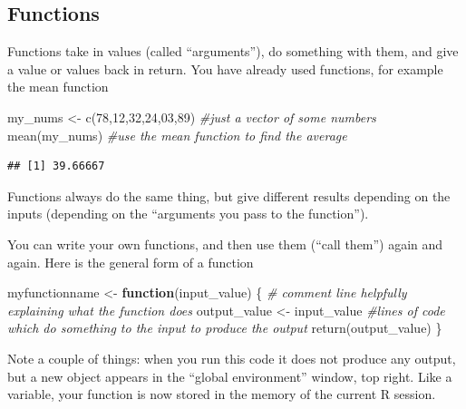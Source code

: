 \documentclass[
  12pt,
  a5paper,
]{book}
\newenvironment{Shaded}{\begin{snugshade}}{\end{snugshade}}
\newcommand{\CommentTok}[1]{\textcolor[rgb]{0.56,0.35,0.01}{\textit{#1}}}
\newcommand{\ControlFlowTok}[1]{\textcolor[rgb]{0.13,0.29,0.53}{\textbf{#1}}}
\newcommand{\DecValTok}[1]{\textcolor[rgb]{0.00,0.00,0.81}{#1}}
\newcommand{\FunctionTok}[1]{\textcolor[rgb]{0.00,0.00,0.00}{#1}}
\newcommand{\NormalTok}[1]{#1}
\newcommand{\OtherTok}[1]{\textcolor[rgb]{0.56,0.35,0.01}{#1}}
\begin{document}
\hypertarget{functions}{%
\subsection{Functions}\label{functions}}

Functions take in values (called ``arguments''), do something with them, and give a value or values back in return. You have already used functions, for example the mean function

\begin{Shaded}
\begin{Highlighting}[]
\NormalTok{my\_nums }\OtherTok{\textless{}{-}} \FunctionTok{c}\NormalTok{(}\DecValTok{78}\NormalTok{,}\DecValTok{12}\NormalTok{,}\DecValTok{32}\NormalTok{,}\DecValTok{24}\NormalTok{,}\DecValTok{03}\NormalTok{,}\DecValTok{89}\NormalTok{) }\CommentTok{\#just a vector of some numbers}
\FunctionTok{mean}\NormalTok{(my\_nums) }\CommentTok{\#use the mean function to find the average}
\end{Highlighting}
\end{Shaded}

\begin{verbatim}
## [1] 39.66667
\end{verbatim}

Functions always do the same thing, but give different results depending on the inputs (depending on the ``arguments you pass to the function'').

You can write your own functions, and then use them (``call them'') again and again. Here is the general form of a function

\begin{Shaded}
\begin{Highlighting}[]
\NormalTok{myfunctionname }\OtherTok{\textless{}{-}} \ControlFlowTok{function}\NormalTok{(input\_value) \{}
\CommentTok{\# comment line helpfully explaining what the function does}
\NormalTok{output\_value }\OtherTok{\textless{}{-}}\NormalTok{ input\_value }\CommentTok{\#lines of code which do something to the input to produce the output}
\FunctionTok{return}\NormalTok{(output\_value)}
\NormalTok{\}}
\end{Highlighting}
\end{Shaded}

Note a couple of things: when you run this code it does not produce any output, but a new object appears in the ``global environment'' window, top right. Like a variable, your function is now stored in the memory of the current R session.
\end{document}
